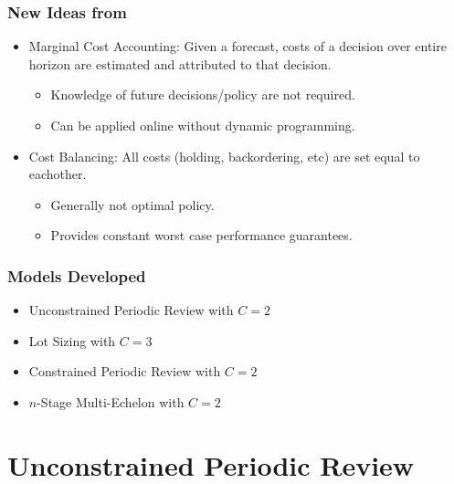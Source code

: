 \documentclass{beamer}
\begin{document}
\begin{frame}

\frametitle{New Ideas from \cite{levi:2007}}
 
\begin{itemize}
	\setlength\itemsep{2em}
	\item Marginal Cost Accounting: Given a forecast, costs of a decision over entire horizon are estimated and attributed to that decision.
		\begin{itemize}
			\item Knowledge of future decisions/policy are not required.
			\item Can be applied online without dynamic programming.
		\end{itemize} 
	\item Cost Balancing: All costs (holding, backordering, etc) are set equal to eachother.
		\begin{itemize}
			\item Generally not optimal policy. 
			\item Provides constant worst case performance guarantees.
		\end{itemize}
\end{itemize}

\end{frame}


\begin{frame}
\frametitle{Models Developed}
\begin{itemize}
	\setlength\itemsep{1em}
	\item Unconstrained Periodic Review with $C = 2$ \citep{levi:2007}
	\item Lot Sizing with $C = 3$ \citep{levi:2007}
	\item Constrained Periodic Review with $C = 2$ \citep{levi:2008}
	\item $n$-Stage Multi-Echelon with $C = 2$ \citep{levi:2016}
\end{itemize}
\end{frame}


\section{Unconstrained Periodic Review}
\end{document}
